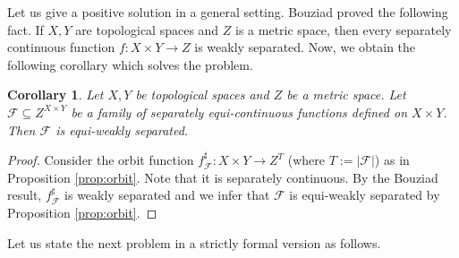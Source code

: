 \documentclass[a4paper]{amsart}
\theoremstyle{plain}
\newtheorem{corollary}[theorem]{Corollary}
\theoremstyle{definition}
\theoremstyle{remark}
\numberwithin{equation}{section}
\newcommand{\mc }{\mathcal}
\begin{document}
Let us give a positive solution in a general setting.
Bouziad \cite[Proposition 4.3]{Bou} proved the following fact. If $X,Y$
are topological spaces and $Z$ is a metric space, then every separately continuous function $f\colon X\times Y\to Z$ is weakly separated. Now, we obtain the following corollary which solves the problem.

\begin{corollary} \label{T1}
Let $X,Y$ be topological spaces and $Z$ be a metric space. Let $\mc F\subseteq Z^{X\times Y}$ be a family of separately equi-continuous functions defined on $X\times Y$. Then $\mc F$ is equi-weakly separated.
\end{corollary}
\begin{proof}
Consider the orbit function $f^\sharp_{\mathscr F}\colon X\times Y\to Z^{T}$ (where $T:=|\mathscr F|$) as in Proposition \ref{prop:orbit}. Note that it is separately continuous. By the Bouziad result, $f^\sharp_{\mathscr F}$
is weakly separated and we infer that ${\mathscr F}$ is equi-weakly separated by Proposition \ref{prop:orbit}.
\end{proof}


Let us state the next problem \cite[Prob.~3.11]{BKS} in a strictly formal version as follows.
\end{document}
